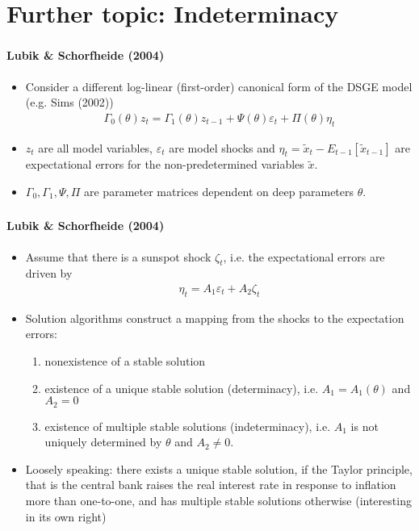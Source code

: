 \documentclass[handout]{beamer}  %
\begin{document}
\section{Further topic: Indeterminacy}
\begin{frame}
\frametitle{\secname}\framesubtitle{Lubik \& Schorfheide (2004)}
\begin{itemize}
  \item Consider a different log-linear (first-order) canonical form of the DSGE model (e.g. Sims (2002))
  \begin{align*}
    \Gamma_0(\theta) z_t = \Gamma_1(\theta) z_{t-1} + \Psi(\theta) \varepsilon_t + \Pi(\theta)\eta_t
  \end{align*}
  \item $z_t$ are all model variables, $\varepsilon_t$ are model shocks and $\eta_t=\widetilde{x}_t-E_{t-1}[\widetilde{x}_{t-1}]$ are expectational errors for the non-predetermined variables $\widetilde{x}$.
  \item $\Gamma_0,\Gamma_1, \Psi, \Pi$ are parameter matrices dependent on deep parameters $\theta$.
\end{itemize}
\end{frame}

\begin{frame}
\frametitle{\secname}\framesubtitle{Lubik \& Schorfheide (2004)}
\begin{itemize}
  \item Assume that there is a sunspot shock $\zeta_t$, i.e. the expectational errors are driven by
  \begin{align*}
    \eta_t = A_1 \varepsilon_t + A_2 \zeta_t
  \end{align*}
  \item Solution algorithms construct a mapping from the shocks to the expectation errors:
  \begin{enumerate}
    \item nonexistence of a stable solution
    \item existence of a unique stable solution (determinacy), i.e. $A_1=A_1(\theta)$ and $A_2=0$
    \item existence of multiple stable solutions (indeterminacy), i.e. $A_1$ is not uniquely determined by $\theta$ and $A_2\neq0$.
  \end{enumerate}
 \item Loosely speaking: there exists a unique stable solution, if the Taylor principle, that is the central bank raises the real interest rate in response to inflation more than one-to-one, and has multiple stable solutions otherwise (interesting in its own right)
\end{itemize}
\end{frame}
\end{document}

